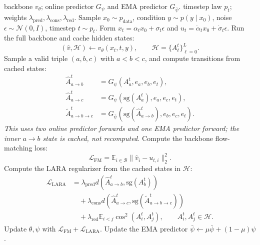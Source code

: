 \begin{algorithm}[!htbp]
\caption{\textbf{LARA training.} Flow matching with layer-aware transition regularization.}
\label{alg:realign_training}
\small
\begin{algorithmic}[1]
\Require backbone $v_\theta$; online predictor $G_\psi$ and EMA predictor $G_{\bar\psi}$.
\Require timestep law $p_t$; weights $\lambda_{\mathrm{pred}},\lambda_{\mathrm{cons}},\lambda_{\mathrm{red}}$.
\Repeat
    \State Sample $x_0\sim p_{\mathrm{data}}$, condition $y\sim p(y\mid x_0)$, noise $\epsilon\sim\mathcal{N}(0,I)$, timestep $t\sim p_t$.
    \State Form $x_t=\alpha_t x_0+\sigma_t\epsilon$ and $u_t=\dot\alpha_t x_0+\dot\sigma_t\epsilon$.
    \State Run the full backbone and cache hidden states:
    \[
    (\hat v,\mathcal{H})\leftarrow v_\theta(x_t,t,y),\qquad
    \mathcal{H}=\{A_\ell^t\}_{\ell=0}^{L}.
    \]
    \State Sample a valid triple $(a,b,c)$ with $a<b<c$, and compute transitions from cached states:
    \[
    \begin{aligned}
    \hat A_{a\to b}^t &= G_\psi(A_a^t,e_a,e_b,e_t),\\
    \hat A_{a\to c}^t &= G_\psi(\mathrm{sg}(A_a^t),e_a,e_c,e_t),\\
    \tilde A_{a\to b\to c}^t
    &= G_{\bar\psi}\!\left(\mathrm{sg}(\hat A_{a\to b}^t),e_b,e_c,e_t\right).
    \end{aligned}
    \]
    \Statex \hspace{\algorithmicindent}\textit{This uses two online predictor forwards and one EMA predictor forward; the inner $a\to b$ state is cached, not recomputed.}
    \State Compute the backbone flow-matching loss:
    \[
    \mathcal{L}_{\mathrm{FM}}
    =
    \mathbb{E}_{i\in\mathcal{B}}\|\hat v_i-u_{t,i}\|_2^2.
    \]
    \State Compute the LARA regularizer from the cached states in $\mathcal{H}$:
    \[
    \begin{aligned}
    \mathcal{L}_{\mathrm{LARA}}
    &=
    \lambda_{\mathrm{pred}}d(\hat A_{a\to b}^t,\mathrm{sg}(A_b^t))\\
    &\quad+\lambda_{\mathrm{cons}}d(\hat A_{a\to c}^t,\mathrm{sg}(\tilde A_{a\to b\to c}^t))\\
    &\quad+\lambda_{\mathrm{red}}\mathbb{E}_{i<j}
    \operatorname{cos}^2(A_i^t,A_j^t),
    \qquad A_i^t,A_j^t\in\mathcal{H}.
    \end{aligned}
    \]
    \State Update $\theta,\psi$ with $\mathcal{L}_{\mathrm{FM}}+\mathcal{L}_{\mathrm{LARA}}$.
    \State Update the EMA predictor $\bar\psi\leftarrow \mu\bar\psi+(1-\mu)\psi$.
\end{algorithmic}
\end{algorithm}

